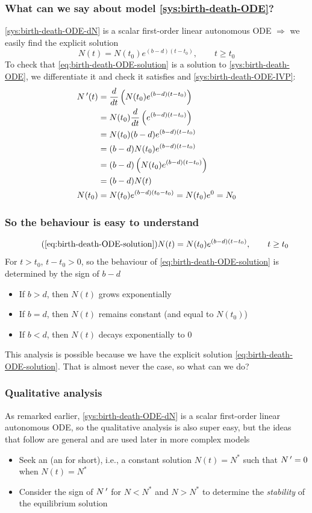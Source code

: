 \documentclass[aspectratio=169]{beamer}
\begin{document}
\begin{frame}\frametitle{What can we say about model \eqref{sys:birth-death-ODE}?}
\eqref{sys:birth-death-ODE-dN} is a scalar first-order linear autonomous ODE
$\Rightarrow$
we easily find the explicit solution
\begin{equation}
\label{eq:birth-death-ODE-solution}
N(t)=N(t_0)e^{(b-d)(t-t_0)},\qquad t\geq t_0
\end{equation}
\vfill
To check that \eqref{eq:birth-death-ODE-solution} is a solution to \eqref{sys:birth-death-ODE}, we differentiate it and check it satisfies and \eqref{sys:birth-death-ODE-IVP}:
\begin{align*}
N\,'(t) &= \frac{d}{dt}\left(N(t_0)e^{(b-d)(t-t_0)}\right) \\
&= N(t_0) \frac{d}{dt}\left(e^{(b-d)(t-t_0)}\right) \\
&= N(t_0)(b-d)e^{(b-d)(t-t_0)} \\
&= (b-d)N(t_0)e^{(b-d)(t-t_0)} \\
&= (b-d)\left(N(t_0)e^{(b-d)(t-t_0)}\right) \\
&= (b-d)N(t) \\
N(t_0) &= N(t_0)e^{(b-d)(t_0-t_0)} = N(t_0)e^0 = N_0
\end{align*}
\end{frame}

\begin{frame}\frametitle{So the behaviour is easy to understand}
\begin{equation}
\tag{\ref{eq:birth-death-ODE-solution}}
N(t)=N(t_0)e^{(b-d)(t-t_0)},\qquad t\geq t_0
\end{equation}
\vfill
For $t>t_0$, $t-t_0>0$, so the behaviour of \eqref{eq:birth-death-ODE-solution} is determined by the sign of $b-d$
\vfill
\begin{itemize}
\item If $b>d$, then $N(t)$ grows exponentially
\item If $b=d$, then $N(t)$ remains constant (and equal to $N(t_0)$)
\item If $b<d$, then $N(t)$ decays exponentially to 0
\end{itemize}
\vfill
This analysis is possible because we have the explicit solution \eqref{eq:birth-death-ODE-solution}. That is almost never the case, so what can we do?
\end{frame}

\begin{frame}\frametitle{Qualitative analysis}
As remarked earlier, \eqref{sys:birth-death-ODE-dN} is a scalar first-order linear autonomous ODE, so the qualitative analysis is also super easy, but the ideas that follow are general and are used later in more complex models
\vfill
\begin{itemize}
\item Seek an  (an  for short), i.e., a constant solution $N(t)=N^*$ such that $N\,'=0$ when $N(t)=N^*$
\item Consider the sign of $N\,'$ for $N<N^*$ and $N>N^*$ to determine the \emph{stability} of the equilibrium solution
\end{itemize}
\end{frame}
\end{document}
